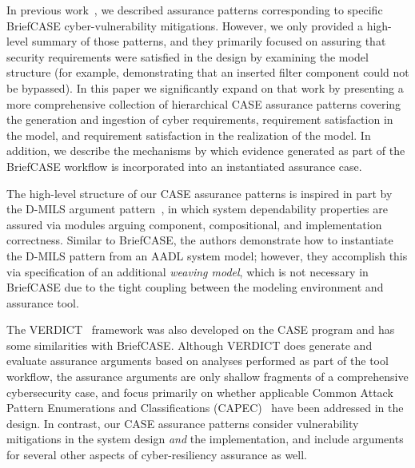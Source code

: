 In previous work~\cite{resolute-destion}, we described assurance patterns corresponding to specific BriefCASE cyber-vulnerability mitigations.  However, we only provided a high-level summary of those patterns, and they primarily focused on assuring that security requirements were satisfied in the design by examining the model structure (for example, demonstrating that an inserted filter component could not be bypassed).
%
In this paper we significantly expand on that work by presenting a more comprehensive collection of hierarchical CASE assurance patterns covering the generation and ingestion of cyber requirements, requirement satisfaction in the model, and requirement satisfaction in the realization of the model.  In addition, we describe the mechanisms by which evidence generated as part of the BriefCASE workflow is incorporated into an instantiated assurance case.

The high-level structure of our CASE assurance patterns is inspired in part by the D-MILS argument pattern~\cite{dmils}, in which system dependability properties are assured via modules arguing component, compositional, and implementation correctness.  Similar to BriefCASE, the authors demonstrate how to instantiate the D-MILS pattern from an AADL system model; however, they accomplish this via specification of an additional \textit{weaving model}, which is not necessary in BriefCASE due to the tight coupling between the modeling environment and assurance tool.

The VERDICT~\cite{verdict} framework was also developed on the CASE program and has some similarities with BriefCASE.  Although VERDICT does generate and evaluate assurance arguments based on analyses performed as part of the tool workflow, the assurance arguments are only shallow fragments of a comprehensive cybersecurity case, and focus primarily on whether applicable Common Attack Pattern Enumerations and Classifications (CAPEC)~\cite{capec} have been addressed in the design.  In contrast, our CASE assurance patterns consider vulnerability mitigations in the system design \textit{and} the implementation, and include arguments for several other aspects of cyber-resiliency assurance as well.


